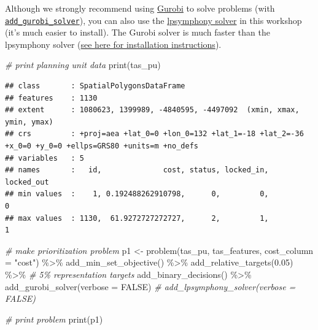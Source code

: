 \documentclass[
  12pt,
]{book}
\newenvironment{Shaded}{\begin{snugshade}}{\end{snugshade}}
\newcommand{\AttributeTok}[1]{\textcolor[rgb]{0.77,0.63,0.00}{#1}}
\newcommand{\CommentTok}[1]{\textcolor[rgb]{0.56,0.35,0.01}{\textit{#1}}}
\newcommand{\ConstantTok}[1]{\textcolor[rgb]{0.00,0.00,0.00}{#1}}
\newcommand{\FloatTok}[1]{\textcolor[rgb]{0.00,0.00,0.81}{#1}}
\newcommand{\FunctionTok}[1]{\textcolor[rgb]{0.00,0.00,0.00}{#1}}
\newcommand{\NormalTok}[1]{#1}
\newcommand{\OtherTok}[1]{\textcolor[rgb]{0.56,0.35,0.01}{#1}}
\newcommand{\SpecialCharTok}[1]{\textcolor[rgb]{0.00,0.00,0.00}{#1}}
\newcommand{\StringTok}[1]{\textcolor[rgb]{0.31,0.60,0.02}{#1}}
\begin{document}
Although we strongly recommend using \href{https://www.gurobi.com/}{Gurobi} to solve problems (with \href{https://prioritizr.net/reference/add_gurobi_solver.html}{\texttt{add\_gurobi\_solver}}), you can also use the \href{https://prioritizr.net/reference/add_lsymphony_solver.html}{lpsymphony solver} in this workshop (it's much easier to install). The Gurobi solver is much faster than the lpsymphony solver (\href{https://prioritizr.net/articles/gurobi_installation.html}{see here for installation instructions}).

\begin{Shaded}
\begin{Highlighting}[]
\CommentTok{\# print planning unit data}
\FunctionTok{print}\NormalTok{(tas\_pu)}
\end{Highlighting}
\end{Shaded}

\begin{verbatim}
## class       : SpatialPolygonsDataFrame 
## features    : 1130 
## extent      : 1080623, 1399989, -4840595, -4497092  (xmin, xmax, ymin, ymax)
## crs         : +proj=aea +lat_0=0 +lon_0=132 +lat_1=-18 +lat_2=-36 +x_0=0 +y_0=0 +ellps=GRS80 +units=m +no_defs 
## variables   : 5
## names       :   id,              cost, status, locked_in, locked_out 
## min values  :    1, 0.192488262910798,      0,         0,          0 
## max values  : 1130,  61.9272727272727,      2,         1,          1
\end{verbatim}

\begin{Shaded}
\begin{Highlighting}[]
\CommentTok{\# make prioritization problem}
\NormalTok{p1 }\OtherTok{\textless{}{-}} \FunctionTok{problem}\NormalTok{(tas\_pu, tas\_features, }\AttributeTok{cost\_column =} \StringTok{"cost"}\NormalTok{) }\SpecialCharTok{\%\textgreater{}\%}
      \FunctionTok{add\_min\_set\_objective}\NormalTok{() }\SpecialCharTok{\%\textgreater{}\%}
      \FunctionTok{add\_relative\_targets}\NormalTok{(}\FloatTok{0.05}\NormalTok{) }\SpecialCharTok{\%\textgreater{}\%} \CommentTok{\# 5\% representation targets}
      \FunctionTok{add\_binary\_decisions}\NormalTok{() }\SpecialCharTok{\%\textgreater{}\%}
      \FunctionTok{add\_gurobi\_solver}\NormalTok{(}\AttributeTok{verbose =} \ConstantTok{FALSE}\NormalTok{)}
      \CommentTok{\# add\_lpsymphony\_solver(verbose = FALSE)}

\CommentTok{\# print problem}
\FunctionTok{print}\NormalTok{(p1)}
\end{Highlighting}
\end{Shaded}
\end{document}
